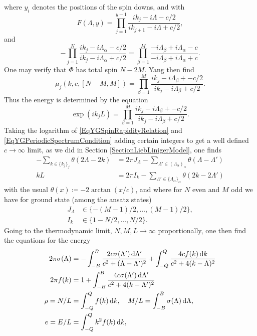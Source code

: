 where $ y_i $ denotes the positions of the spin downs, and with \begin{equation}
F(\Lambda,y)=\prod_{j=1}^{y-1}\frac{ik_j-i\Lambda-c/2}{ik_{j+1}-i\Lambda+c/2},
\end{equation}
and \begin{equation}\label{EqYGSpinRapidityRelation}
-\prod_{j=1}^{N}\frac{ik_j-i\Lambda_\alpha-c/2}{ik_{j}-i\Lambda_\alpha+c/2}=\prod_{\beta=1}^{M}\frac{-i\Lambda_\beta+i\Lambda_\alpha-c}{-i\Lambda_\beta+i\Lambda_\alpha+c}.
\end{equation}
One may verify that $ \Phi $ has total spin $ N-2M $.
Yang then find \begin{equation}
\mu_j(k,c,[N-M,M])=\prod_{\beta=1}^{M}\frac{ik_j-i\Lambda_\beta+-c/2}{ik_j-i\Lambda_\beta+c/2}.
\end{equation}
Thus the energy is determined by the equation\begin{equation}\label{EqYGPeriodicSpectrumCondition}
\exp(ik_jL)=\prod_{\beta=1}^{M}\frac{ik_j-i\Lambda_\beta+-c/2}{ik_j-i\Lambda_\beta+c/2}.
\end{equation}
Taking the logarithm of \eqref{EqYGSpinRapidityRelation} and \eqref{EqYGPeriodicSpectrumCondition} adding certain integers to get a well defined $ c\to\infty $ limit, as we did in Section \ref{SectionLiebLinigerModel}, one finds \begin{equation}\label{EqYGintegers}
\begin{aligned}
-\sum_{k\in\{k_j\}_j}\theta(2\Lambda-2k)&=2\pi J_\Lambda-\sum_{\Lambda'\in(\Lambda_\alpha)_\alpha}\theta(\Lambda-\Lambda')\\
kL&=2\pi I_k-\sum_{\Lambda'\in\{\Lambda_\alpha\}_\alpha}\theta(2k-2\Lambda')
\end{aligned}
\end{equation}
with the usual $ \theta(x)\coloneqq-2\arctan(x/c) $, and where for $ N $ even and $ M $ odd we have for ground state (among the ansatz states)\begin{equation}
\begin{aligned}
J_\Lambda&\in\{-(M-1)/2,\ldots,(M-1)/2\},\\
I_k&\in \{1-N/2,\ldots,N/2\}.
\end{aligned}
\end{equation}
Going to the thermodynamic limit, \ie $ N,M,L\to\infty $ proportionally, one then find the equations for the energy \begin{align}
2\pi\sigma(\Lambda)&=-\int_{-B}^{B}\frac{2c\sigma(\Lambda')\mathop{}\!\mathrm{d} \Lambda'}{c^2+(\Lambda-\Lambda')^2}+\int_{-Q}^{Q}\frac{4c f(k)\mathop{}\!\mathrm{d} k}{c^2+4(k-\Lambda)^2}\label{EqYG1}\\
2\pi f(k) &= 1+\int_{-B}^{B}\frac{4c\sigma(\Lambda')\mathop{}\!\mathrm{d} \Lambda'}{c^2+4(k-\Lambda')^2}\label{EqYG2}\\
\rho=N/L&=\int_{-Q}^{Q} f(k) \mathop{}\!\mathrm{d} k,\quad M/L=\int_{-B}^{B}\sigma(\Lambda)\mathop{}\!\mathrm{d}\Lambda,\label{EqYG3}\\
e=E/L&=\int_{-Q}^{Q}k^2 f(k)\mathop{}\!\mathrm{d} k \label{EqYG4},
\end{align}
